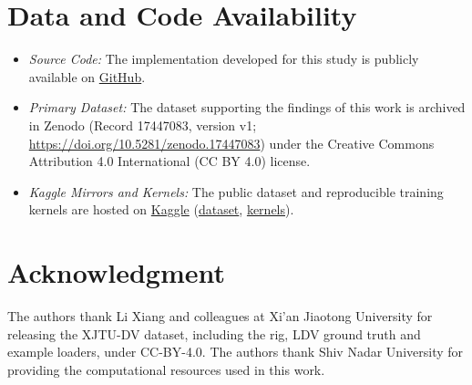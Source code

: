 \documentclass[conference]{IEEEtran}
\begin{document}
\section*{Data and Code Availability}

\begin{itemize}
\item \textit{Source Code:} The implementation developed for this study is publicly available on \href{https://github.com/arnabwithab/struct-x}{GitHub}.
\item \textit{Primary Dataset:} The dataset supporting the findings of this work is archived in Zenodo (Record 17447083, version v1; \url{https://doi.org/10.5281/zenodo.17447083}) under the Creative Commons Attribution 4.0 International (CC BY 4.0) license.
\item \textit{Kaggle Mirrors and Kernels:} The public dataset and reproducible training kernels are hosted on \href{https://www.kaggle.com/datasets/eros483/struct-x-beam}{Kaggle} (\href{https://www.kaggle.com/datasets/eros483/struct-x-beam}{dataset}, \href{https://www.kaggle.com/code/eros438/struct-x-train}{kernels}).
\end{itemize}

\section*{Acknowledgment}
The authors thank Li Xiang and colleagues at Xi'an Jiaotong University for releasing the XJTU-DV dataset, including the rig, LDV ground truth and example loaders, under CC-BY-4.0. The authors thank Shiv Nadar University for providing the computational resources used in this work.
\end{document}
